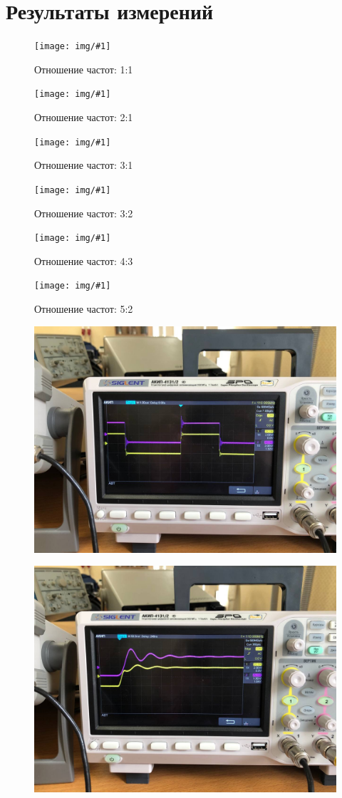 \section{Результаты измерений}
\newcommand{\lissaju}[1]{\begin{figure}[ht!]\centering\texttt{[image: img/\#1]}\caption{Отношение частот: #1}\end{figure}}

\lissaju{1:1}
\lissaju{2:1}
\lissaju{3:1}
\lissaju{3:2}
\lissaju{4:3}
\lissaju{5:2}

\begin{figure}[ht!]\centering\includegraphics[width=0.8\linewidth]{img/shit1}\end{figure}
\begin{figure}[ht!]\centering\includegraphics[width=0.8\linewidth]{img/shit2}\end{figure}

